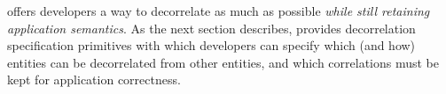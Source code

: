 \sys{} offers developers a way to decorrelate as much as possible \emph{while still retaining
application semantics}. As the next section describes, \sys{} provides decorrelation specification
primitives with which developers can specify which (and how) entities can be decorrelated from other
entities, and which correlations must be kept for application correctness.

